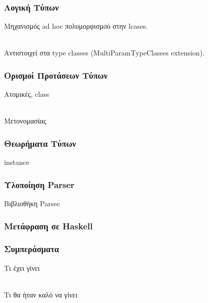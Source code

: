 \documentclass{beamer}
\def\e{\foreignlanguage{english}}
\def\h{\e{Haskell}}
\begin{document}
\begin{frame}

\frametitle{Λογική Τύπων}

Μηχανισμός \e{ad hoc} πολυμορφισμού στην \e{lcases}.
\\~\

Αντιστοιχεί στα \e{type classes (MultiParamTypeClasses extension)}.

\end{frame}

\begin{frame}

\frametitle{Ορισμοί Προτάσεων Τύπων}

Ατομικές, \e{class}
\\~\

Μετονομασίας

\end{frame}

\begin{frame}

\frametitle{Θεωρήματα Τύπων}

\e{instance}

\end{frame}

\begin{frame}

\frametitle{Υλοποίηση \e{Parser}}

Βιβλιοθήκη \e{Parsec}

\end{frame}

\begin{frame}

\frametitle{Μετάφραση σε \h}

\end{frame}

\begin{frame}

\frametitle{Συμπεράσματα}

Τι έχει γίνει
\\~\

Τι θα ήταν καλό να γίνει

\end{frame}
\end{document}
